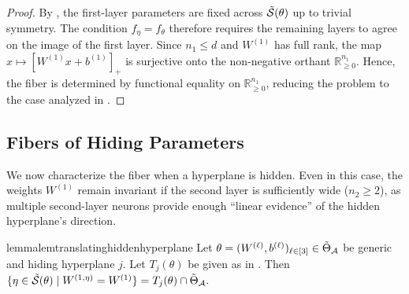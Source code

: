 \documentclass{article}
\newtheorem{lemma}[theorem]{Lemma}
\theoremstyle{definition}
\newcommand{\R}{\mathbb{R}}
\newcommand{\architecture}{\mathcal{A}}
\newcommand{\gparamspace}[1]{\Tilde{\Theta}_{#1}}
\newcommand{\weights}[1]{W^{(#1)}}
\newcommand{\bias}[1]{b^{(#1)}}
\newcommand{\gfiber}[1]{\Tilde{\mathcal{S}}({#1})}
\newcommand{\orthant}[1]{\R_{\geq 0}^{#1}}
\begin{document}
\begin{proof}
By , 
the first-layer parameters are fixed across $\gfiber{\theta}$ 
up to trivial symmetry. 
The condition $f_\eta = f_\theta$ therefore requires the remaining layers to agree on the image of the first layer. 
%
Since $n_1 \le d$ and $\weights{1}$ has full rank, 
the map $x \mapsto [\weights{1}x + \bias{1}]_+$ is surjective onto the non-negative orthant $\orthant{n_1}$. 
%
Hence, the fiber is determined by functional equality on $\orthant{n_1}$, reducing the problem to the case analyzed in . 
\end{proof}







\subsection{Fibers of Hiding Parameters} 
 \label{app:fibers_hiding}

We now characterize the fiber when a hyperplane is hidden. Even in this case, the weights $\weights{1}$ remain invariant if the second layer is sufficiently wide ($n_2 \ge 2$), as multiple second-layer neurons provide enough ``linear evidence'' of the hidden hyperplane’s direction.



\begin{restatable}{lemma}{lemtranslatinghiddenhyperplane}
\label{lem:translating_hidden_hyperplane}
Let $\theta = (\weights{\ell},\bias{\ell})_{\ell \in [3]} \in \gparamspace{\architecture}$ be generic and hiding hyperplane $j$. Let $T_j(\theta)$ be given as in . 
Then 
\(
\{\eta \in \gfiber{\theta} \mid \weights{1,\eta} = \weights{1}\}
=
T_j(\theta)\cap \gparamspace{\architecture}. 
\)
\end{restatable} 
\end{document}
